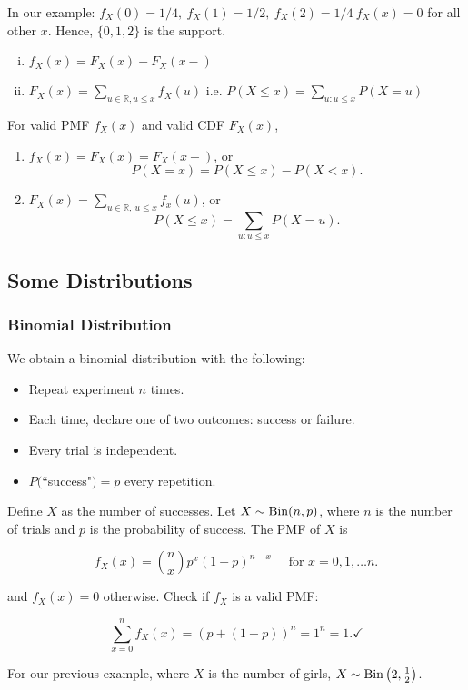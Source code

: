  In our example: $f_X(0)=1/4, \ f_X(1)=1/2, \ f_X(2)=1/4 \ f_X(x)=0$ for all other $x.$ Hence, $\{0,1,2\}$ is the support.


\begin{enumerate}[(i)]
    \item $f_X(x)=F_X(x)-F_X(x-)$
    \item $F_X(x)=\sum_{u\in \mathbb R, u\leq x}f_X(u)$ 
    i.e. $P(X\leq x)=\sum_{u:u\leq x}P(X=u)$
\end{enumerate}

\begin{prop}
For valid PMF $f_X(x)$ and valid CDF $F_X(x)$,

\begin{enumerate}[(i.)]
    \item $f_X(x)=F_X(x)=F_X(x-)$, or $$P(X=x)=P(X\leq x)-P(X<x).$$
    \item $F_X(x)=\sum_{u\in \mathbb R, \ u\leq x}f_x(u)$, or
    $$P(X\leq x)=\sum_{u:u\leq x}P(X=u).$$
\end{enumerate}
\end{prop}
\subsection{Some Distributions}
\subsubsection{Binomial Distribution}
We obtain a binomial distribution with the following:
\begin{itemize}
    \item Repeat experiment $n$ times.
    \item Each time, declare one of two outcomes: success or failure.
    \item Every trial is independent.
    \item $P($``success"$)=p$ every repetition.
\end{itemize}

    Define $X$ as the number of successes. Let $X\sim \operatorname*{Bin}(n,p)$, where $n$ is the number of trials and $p$ is the probability of success. The PMF of $X$ is
    
    $$f_X(x)=\binom{n}{x}p^x(1-p)^{n-x}\quad \text{ for } x=0,1,\dots n.$$
    
    and $f_X(x)=0$ otherwise. Check if $f_X$ is a valid PMF:
    
    $$
    \sum^n_{x=0}f_X(x)=(p+(1-p))^n=1^n=1. \checkmark
    $$
\begin{eg}
		For our previous example, where $X$ is the number of girls, $X\sim \operatorname*{Bin}\left(2,\frac{1}{2}\right)$.
\end{eg}
